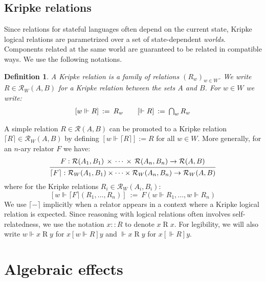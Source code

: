 \documentclass[draft,11pt]{report}
\newtheorem{definition}{Definition}
\newcommand{\ifr}[1]{\mathrel{[{#1}]}}
\begin{document}
\subsection{Kripke relations}

Since relations for stateful languages
often depend on the current state,
Kripke logical relations
are parametrized over a set of state-dependent \emph{worlds}.
Components related at the same world
are guaranteed to be related in compatible ways.
We use the following notations.

\begin{definition} \label{def:klr} %
A \emph{Kripke} relation is
a family of relations $(R_w)_{w \in W}$.
We write $R \in \mathcal{R}_W(A, B)$
for a Kripke relation between the sets $A$ and $B$.
For $w \in W$ we write:
\[
\begin{array}{c@{\qquad}c}
    [w \Vdash R] \: := \: R_w &
    [\Vdash R] \: := \: \bigcap_{w} R_w
\end{array}
\]
\end{definition}

A simple relation $R \in \mathcal{R}(A, B)$
can be promoted to a Kripke relation
$\lceil R \rceil \in \mathcal{R}_W(A, B)$
by defining $[w \Vdash \lceil R \rceil] := R$ for all $w \in W$.
More generally, for an $n$-ary relator $F$ we have:
\[
  \begin{prooftree}
  \hypo{
    F :
      \mathcal{R}(A_1, B_1) \,\times\,\cdots\,\times\,\mathcal{R}(A_n, B_n)
      \rightarrow \mathcal{R}(A, B)}
  \infer1{
    \lceil F \rceil :
      \mathcal{R}_W(A_1, B_1) \times \cdots \times \mathcal{R}_W(A_n, B_n)
      \rightarrow \mathcal{R}_W(A, B)}
  \end{prooftree}
\]
where for the Kripke relations $R_i \in \mathcal{R}_W(A_i, B_i)$:
\[
  [w \Vdash \lceil F \rceil (R_1, \ldots, R_n)] \: := \:
    F(w \Vdash R_1, \ldots, w \Vdash R_n)
\]
We use $\lceil - \rceil$ implicitly
when a relator appears in a context where
a Kripke logical relation is expected.
Since reasoning with logical relations
often involves self-relatedness,
we use the notation
$x :: R$ to denote $x \mathrel{R} x$.
For legibility, we will also write
$w \Vdash x \mathrel{R} y$ for $x \ifr{w \Vdash R} y$
and $\Vdash x \mathrel{R} y$ for $x \ifr{\Vdash R} y$.


\section{Algebraic effects} %
\end{document}
